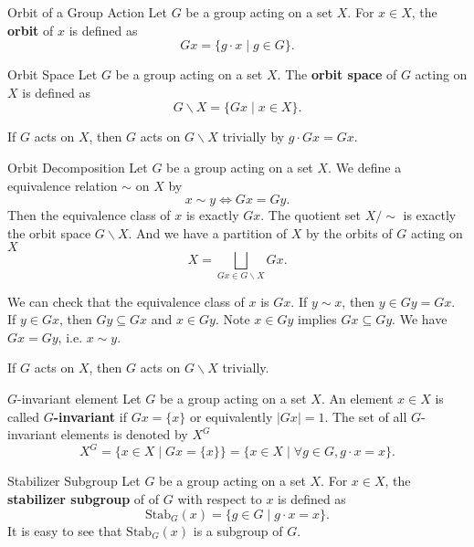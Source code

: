 \begin{definition}{Orbit of a Group Action}{}
    Let $G$ be a group acting on a set $X$. For $x\in X$, the \textbf{orbit} of $x$ is defined as
    \[
        G x=\{ g\cdot x\mid g\in G\}    .
    \]
\end{definition}


\begin{definition}{Orbit Space}{}
    Let $G$ be a group acting on a set $X$. The \textbf{orbit space} of $G$ acting on $X$ is defined as
    \[
        G\backslash X=\{ Gx\mid x\in X\}.
    \]
\end{definition}

If $G$ acts on $X$, then $G$ acts on $G\backslash X$ trivially by $g\cdot Gx=Gx$.
\begin{proposition}{Orbit Decomposition}{}
    Let $G$ be a group acting on a set $X$. We define a equivalence relation $\sim$ on $X$ by
    \[
        x\sim y \iff Gx=Gy.
    \]
    Then the equivalence class of $x$ is exactly $Gx$. The quotient set $X/\sim$ is exactly the orbit space $G\backslash X$.
    And we have a partition of $X$ by the orbits of $G$ acting on $X$
    \[
        X=\bigsqcup_{Gx\in G\backslash X}Gx.
    \]
\end{proposition}

\begin{prf}
    We can check that the equivalence class of $x$ is $Gx$. If $y\sim x$, then $y\in Gy=Gx$. If $y\in Gx$, then $Gy\subseteq Gx$ and $x\in Gy$. Note $x\in Gy$ implies $Gx\subseteq Gy$. We have $Gx=Gy$, i.e. $x\sim y$.
\end{prf}


If $G$ acts on $X$, then $G$ acts on $G\backslash X$ trivially.
\begin{definition}{$G$-invariant element }{}
    Let $G$ be a group acting on a set $X$. An element $x\in X$ is called \textbf{$G$-invariant} if $Gx=\{ x\}$ or equivalently $|Gx|=1$. The set of all $G$-invariant elements is denoted by $X^G$
    \[
        X^G=\{ x\in X\mid Gx=\{ x\} \} =  \{ x\in X\mid \forall g\in G, g\cdot x=x \} .
    \]
\end{definition}


\begin{definition}{Stabilizer Subgroup}{}
    Let $G$ be a group acting on a set $X$. For $x\in X$, the \textbf{stabilizer subgroup} of of $G$ with respect to $x$ is defined as
    \[
        \mathrm{Stab}_G(x)=\{ g\in G\mid g\cdot x=x\}    .
    \]
    It is easy to see that $\mathrm{Stab}_G(x)$ is a subgroup of $G$.
\end{definition}

